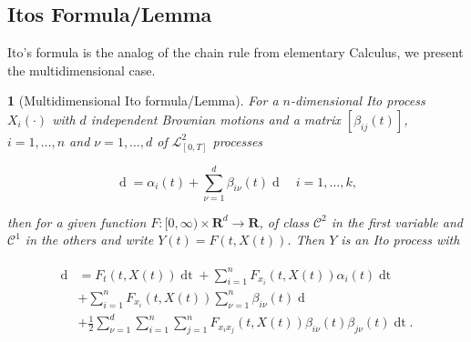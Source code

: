 \documentclass[british]{amsart} \usepackage{lmodern}
\numberwithin{equation}{section} \numberwithin{figure}{section}
\theoremstyle{plain} \newtheorem{thm}{\protect\theoremname}[section]
\theoremstyle{definition} \newtheorem{defn}[thm]{\protect\definitionname}
\theoremstyle{plain} \newtheorem{assumption}[thm]{\protect\assumptionname}
\theoremstyle{plain} \newtheorem{lem}[thm]{\protect\lemmaname}
\theoremstyle{plain} \newtheorem{prop}[thm]{\protect\propositionname}
\theoremstyle{remark} \newtheorem{rem}[thm]{\protect\remarkname}
\theoremstyle{plain} \newtheorem{cor}[thm]{\protect\corollaryname}
\renewcommand{\d}[1]{\mathop{\mathrm{d}{#1}}}
\begin{document}
\subsection{Itos Formula/Lemma}

Ito's formula is the analog of the chain rule from elementary Calculus, we
present the multidimensional case.

\begin{thm} [Multidimensional Ito formula/Lemma]

  For a $n$-dimensional Ito process $X_{i}(\cdot)$ with $d$ independent Brownian motions and a
  matrix $[\beta_{ij}(t)]$, $i=1,\dots,n$ and $\nu=1,\dots,d$ of $\mathcal{L}_{[0,T]}^{2}$ processes

  \begin{equation}
    \d{X_{i}(t)} = \alpha_i(t) + \sum_{\nu=1}^d \beta_{i\nu}(t)\d{W_{\nu}(t)}
    \quad i=1,\dots,k,
  \end{equation}

  then for a given function $F:[0,\infty) \times \mathbf{R}^d \to \mathbf{R}$, of
  class $\mathcal{C}^2$ in the first variable and $\mathcal{C}^1$ in the others
  and write $Y(t)=F(t,X(t))$. Then $Y$ is an Ito process with

   \begin{gather}
    \begin{split}
    \d{Y(t)} &= F_{t}(t, X(t))\d{t} + \sum_{i=1}^n F_{x_{i}}(t,X(t)) \alpha_{i}(t)\d{t} \\
             & + \sum_{i=1}^n F_{x_{i}}(t,X(t)) \sum_{\nu=1}^n \beta_{i\nu}(t)\d{W_{\nu}(t)} \\
             & + \frac{1}{2} \sum_{\nu=1}^d \sum_{i=1}^n \sum_{j=1}^n
                  F_{x_{i}x_{j}}(t,X(t)) \beta_{i\nu}(t) \beta_{j\nu}(t)\d{t}.
    \end{split}
  \end{gather}
\end{thm}
\end{document}
